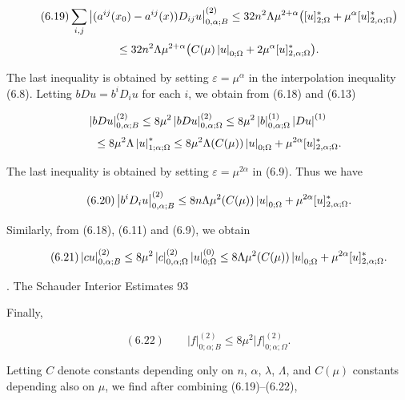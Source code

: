 \begin{theorem}
\begin{equation}\tag{6.19}
\sum_{i,j}\left|(a^{ij}(x_0)-a^{ij}(x))D_{ij}u\right|^{(2)}_{0,\alpha;B}\leq 32n^2\Lambda\mu^{2+\alpha}\bigl([u]^{\ast}_{2;\Omega}+\mu^\alpha[u]^{\ast}_{2,\alpha;\Omega}\bigr)
\end{equation}
\[
\qquad \leq 32n^2\Lambda\mu^{2+\alpha}\bigl(C(\mu)\left|u\right|_{0;\Omega}+2\mu^\alpha[u]^{\ast}_{2,\alpha;\Omega}\bigr).
\]

The last inequality is obtained by setting $\varepsilon=\mu^\alpha$ in the interpolation inequality (6.8).
Letting $bDu=b^iD_i u$ for each $i$, we obtain from (6.18) and (6.13)

\[
\left|bDu\right|^{(2)}_{0,\alpha;B}\leq 8\mu^2\left|bDu\right|^{(2)}_{0,\alpha;\Omega}\leq 8\mu^2\left|b\right|^{(1)}_{0,\alpha;\Omega}\left|Du\right|^{(1)}
\]
\[
\qquad \leq 8\mu^2\Lambda\left|u\right|^{\ast}_{1;\alpha;\Omega}\leq 8\mu^2\Lambda(C(\mu))\left|u\right|_{0;\Omega}+\mu^{2\alpha}[u]^{\ast}_{2,\alpha;\Omega}.
\]

The last inequality is obtained by setting $\varepsilon=\mu^{2\alpha}$ in (6.9). Thus we have

\begin{equation}\tag{6.20}
\left|b^iD_i u\right|^{(2)}_{0,\alpha;B}\leq 8n\Lambda\mu^2(C(\mu))\left|u\right|_{0;\Omega}+\mu^{2\alpha}[u]^{\ast}_{2,\alpha;\Omega}.
\end{equation}

Similarly, from (6.18), (6.11) and (6.9), we obtain

\begin{equation}\tag{6.21}
\left|cu\right|^{(2)}_{0,\alpha;B}\leq 8\mu^2\left|c\right|^{(2)}_{0,\alpha;\Omega}\left|u\right|^{(0)}_{0;\Omega}\leq 8\Lambda\mu^2(C(\mu))\left|u\right|_{0;\Omega}+\mu^{2\alpha}[u]^{\ast}_{2,\alpha;\Omega}.
\end{equation}





. The Schauder Interior Estimates \hfill 93

\noindent Finally,

\begin{equation*}
(6.22)\qquad \lvert f\rvert^{(2)}_{0;\alpha;B}\le 8\mu^2 \lvert f\rvert^{(2)}_{0;\alpha;\Omega}.
\end{equation*}

\noindent Letting $C$ denote constants depending only on $n$, $\alpha$, $\lambda$, $\Lambda$, and $C(\mu)$ constants
depending also on $\mu$, we find after combining (6.19)--(6.22),


\end{theorem}
